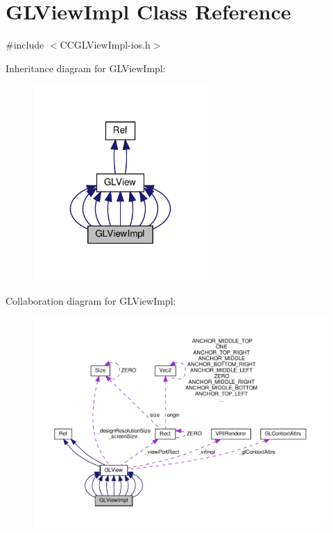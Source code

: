 \hypertarget{classGLViewImpl}{}\section{G\+L\+View\+Impl Class Reference}
\label{classGLViewImpl}


{\ttfamily \#include $<$C\+C\+G\+L\+View\+Impl-\/ios.\+h$>$}



Inheritance diagram for G\+L\+View\+Impl\+:
\nopagebreak
\begin{figure}[H]
\begin{center}
\leavevmode
\includegraphics[width=188pt]{classGLViewImpl__inherit__graph}
\end{center}
\end{figure}


Collaboration diagram for G\+L\+View\+Impl\+:
\nopagebreak
\begin{figure}[H]
\begin{center}
\leavevmode
\includegraphics[width=350pt]{classGLViewImpl__coll__graph}
\end{center}
\end{figure}
